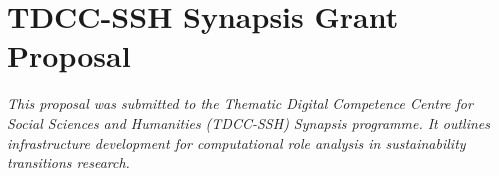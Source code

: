 \documentclass[../main.tex]{subfiles}
\begin{document}
\chapter{TDCC-SSH Synapsis Grant Proposal}

\begin{fullwidthpar}
\textit{This proposal was submitted to the Thematic Digital Competence Centre for Social Sciences and Humanities (TDCC-SSH) Synapsis programme. It outlines infrastructure development for computational role analysis in sustainability transitions research.}
\end{fullwidthpar}

\vspace{1cm}


\end{document}
